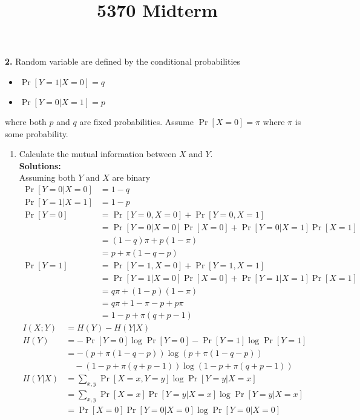 \documentclass{assignment}
\begin{document}
\title{5370 Midterm}


\textbf{2.} Random variable are defined by the conditional probabilities
\begin{itemize}
\item  $\Pr[Y=1 | X=0] =q$
\item  $\Pr[Y=0 | X=1]=p$
\end{itemize}
where both $p$ and $q$ are fixed probabilities.
Assume $\Pr [X=0] =\pi $ where $\pi$ is some probability.
\begin{enumerate}
\item Calculate the mutual information between $X$ and $Y$.\\
  \textbf{Solutions:}\\

  Assuming both $Y$ and $X$ are binary
  \begin{align*}
    \Pr[Y=0 | X=0] & = 1 - q \\
    \Pr[Y=1 | X=1] & = 1 - p \\
    \Pr[Y=0] & = \Pr[Y=0, X=0] + \Pr[Y=0, X=1] \\
                   & = \Pr[Y=0 | X=0]\Pr[X=0] + \Pr[Y=0 | X=1]\Pr[X=1] \\
                   & = (1- q) \pi + p(1 - \pi) \\
                   & = p + \pi (1 - q - p) \\
    \Pr[Y=1] & = \Pr[Y=1, X=0] + \Pr[Y=1, X=1] \\
                   & = \Pr[Y=1 | X=0]\Pr[X=0] + \Pr[Y=1 | X=1]\Pr[X=1] \\
                   & = q \pi + (1- p) (1 - \pi) \\
                   & = q \pi + 1 - \pi - p + p \pi \\
                   & = 1 - p + \pi (q + p - 1)
  \end{align*}
  \begin{align*}
    I(X;Y) & = H(Y) - H(Y|X) \\
    H(Y) & = -\Pr[Y=0] \log \Pr[Y=0] - \Pr[Y=1] \log \Pr[Y=1] \\
         & = - (p + \pi (1 - q - p)) \log (p + \pi (1 - q - p)) \\
         & \quad - (1 - p + \pi (q + p - 1)) \log (1 - p + \pi (q + p - 1)) \\
    H(Y|X) & = \sum_{x,y}\Pr[X=x, Y=y]\log \Pr[Y=y|X=x] \\
           & = \sum_{x, y} \Pr[X=x] \Pr[Y=y|X=x] \log \Pr[Y=y|X=x] \\
           & = \Pr[X=0]\Pr[Y=0|X=0] \log \Pr[Y=0|X=0] \\

\end{align*}
\end{enumerate}
\end{document}
